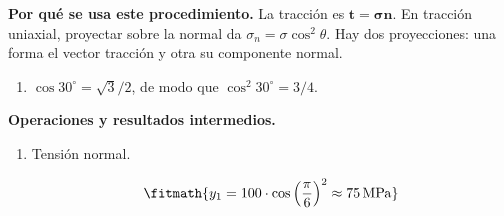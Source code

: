\noindent\textbf{Por qué se usa este procedimiento.} La tracción es $\boldsymbol t=\boldsymbol\sigma\boldsymbol n$. En tracción uniaxial, proyectar sobre la normal da $\sigma_n=\sigma\cos^2\theta$. Hay dos proyecciones: una forma el vector tracción y otra su componente normal.

\begin{enumerate}

\item $\cos 30^{\circ} = \sqrt3/2$, de modo que $\cos^2 30^{\circ} = 3/4$.

\end{enumerate}

\noindent\textbf{Operaciones y resultados intermedios.}

\begin{enumerate}

\item Tensión normal.

\[\fitmath{y_{1}=100\cdot {\cos\left(\frac{\pi}{6}\right)}^{2}\approx 75\,\mathrm{MPa}}\]

\end{enumerate}
